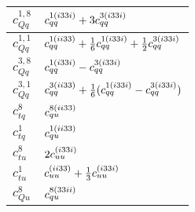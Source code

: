 \begin{table}[htbp]
\begin{center}
\begin{tabular}{ll}
            \midrule      
  $c_{Qq}^{1,8}$       &  	 $\ccc{1}{qq}{i33i}+3\ccc{3}{qq}{i33i}$     \\   \hline
  $c_{Qq}^{1,1}$         &   $\ccc{1}{qq}{ii33}+\frac{1}{6}\ccc{1}{qq}{i33i}+\frac{1}{2}\ccc{3}{qq}{i33i} $   \\    \hline
   $c_{Qq}^{3,8}$         &   $\ccc{1}{qq}{i33i}-\ccc{3}{qq}{i33i} $   \\   \hline
  $c_{Qq}^{3,1}$          & 	$\ccc{3}{qq}{ii33}+\frac{1}{6}(\ccc{1}{qq}{i33i}-\ccc{3}{qq}{i33i}) $   \\     \hline
   $c_{tq}^{8}$         &  $ \ccc{8}{qu}{ii33}   $ \\    \hline
   $c_{tq}^{1}$       &   $  \ccc{1}{qu}{ii33} $\\    \hline
   $c_{tu}^{8}$      &   $2\ccc{}{uu}{i33i}$  \\     \hline
    $c_{tu}^{1}$        &   $ \ccc{}{uu}{ii33} +\frac{1}{3} \ccc{}{uu}{i33i} $ \\   \hline
    $c_{Qu}^{8}$         &  $  \ccc{8}{qu}{33ii}$\\     \hline

\end{tabular}
\end{center}
\end{table}
